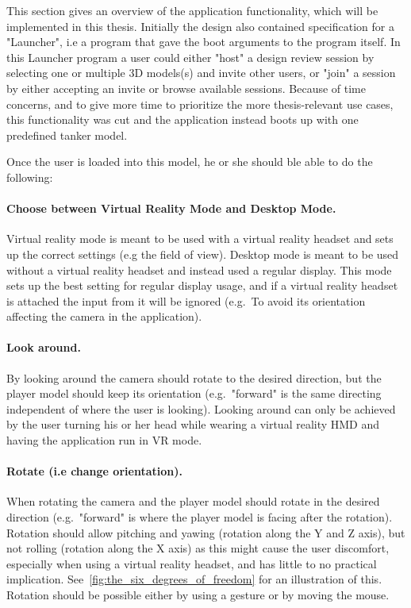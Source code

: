 
This section gives an overview of the application functionality, which will be implemented in this thesis.
Initially the design also contained specification for a "Launcher", i.e a program that gave the boot arguments to the program itself.
In this Launcher program a user could either "host" a design review session by selecting one or multiple 3D models(s) and invite other users, or
"join" a session by either accepting an invite or browse available sessions. Because of time concerns, and to give more time to prioritize the 
more thesis-relevant use cases, this functionality was cut and the application instead boots up with one predefined tanker model. 

Once the user is loaded into this model, he or she should ble able to do the following:

\paragraph{Choose between Virtual Reality Mode and Desktop Mode.} Virtual reality mode is meant to be used with a virtual reality headset
and sets up the correct settings (e.g the field of view). Desktop mode is meant to be used without a virtual reality headset and instead used
a regular display. This mode sets up the best setting for regular display usage, and if a virtual reality headset is attached the input from it will be ignored 
(e.g.~To avoid its orientation affecting the camera in the application).

\paragraph{Look around.} By looking around the camera should rotate to the desired direction, but the player model should keep its orientation 
(e.g.~"forward" is the same directing independent of where the user is looking). Looking around can only be achieved by the user turning his or her 
head while wearing a virtual reality HMD and having the application run in VR mode.

\paragraph{Rotate (i.e change orientation).} When rotating the camera and the player model should rotate in the desired direction (e.g.~"forward" is where the player model is
facing after the rotation).
Rotation should allow pitching and yawing (rotation along the Y and Z axis), but not rolling (rotation along the X axis) as this might cause the user discomfort, especially when
using a virtual reality headset, and has little to no practical implication. See~\vref{fig:the_six_degrees_of_freedom} for an illustration of this. 
Rotation should be possible either by using a gesture or by moving the mouse.

